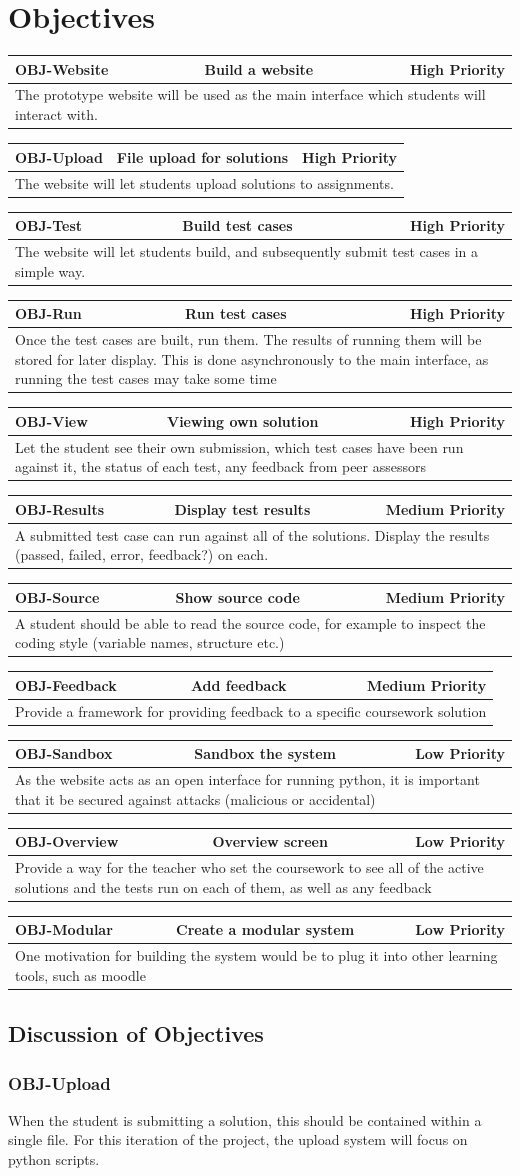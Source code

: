 \documentclass[a4paper,11pt]{report}
\newcommand{\objitem}[4]{\begin{tabularx}{\textwidth}{|l|cr|} \hline \textbf{OBJ-#1} & #2 & #3 \\ \hline \multicolumn{3}{|X|}{#4} \\ \hline \end{tabularx}}
\begin{document}
\section{Objectives}
\objitem{Website}{Build a website}{High Priority}{The prototype website will be used as the main interface which students will interact with.}
\objitem{Upload}{File upload for solutions}{High Priority}{The website will let students upload solutions to assignments.}
\objitem{Test}{Build test cases}{High Priority}{The website will let students build, and subsequently submit test cases in a simple way.}
\objitem{Run}{Run test cases}{High Priority}{Once the test cases are built, run them. The results of running them will be stored for later display. This is done asynchronously to the main interface, as running the test cases may take some time}
\objitem{View}{Viewing own solution}{High Priority}{Let the student see their own submission, which test cases have been run against it, the status of each test, any feedback from peer assessors}
\objitem{Results}{Display test results}{Medium Priority}{A submitted test case can run against all of the solutions. Display the results (passed, failed, error, feedback?) on each.}
\objitem{Source}{Show source code}{Medium Priority}{A student should be able to read the source code, for example to inspect the coding style (variable names, structure etc.)}
\objitem{Feedback}{Add feedback}{Medium Priority}{Provide a framework for providing feedback to a specific coursework solution}
\objitem{Sandbox}{Sandbox the system}{Low Priority}{As the website acts as an open interface for running python, it is important that it be secured against attacks (malicious or accidental)}
\objitem{Overview}{Overview screen}{Low Priority}{Provide a way for the teacher who set the coursework to see all of the active solutions and the tests run on each of them, as well as any feedback}
\objitem{Modular}{Create a modular system}{Low Priority}{One motivation for building the system would be to plug it into other learning tools, such as moodle}

\subsection{Discussion of Objectives}
\subsubsection*{OBJ-Upload}
When the student is submitting a solution, this should be contained within a single file. For this iteration of the project, the upload system will focus on python scripts.
\end{document}
